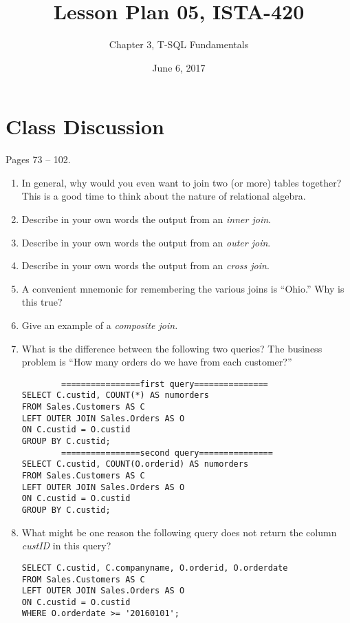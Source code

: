 \documentclass{article}
\title{Lesson Plan 05, ISTA-420}
\author{Chapter 3, T-SQL Fundamentals}
\date{June 6, 2017}
\begin{document}
    

    \maketitle{}

    \section{Class Discussion}

    Pages 73 -- 102.

    \begin{enumerate}
        \item In general, why would you even want to join two (or more) tables together? This is a good time to think about the nature of relational algebra.
        \item Describe in your own words the output from an \textit{inner join}.
        \item Describe in your own words the output from an \textit{outer join}.
        \item Describe in your own words the output from an \textit{cross join}.
        \item A convenient mnemonic for remembering the various joins is ``Ohio.'' Why is this true?
        \item Give an example of a \textit{composite join.}
        \item What is the difference between the following two queries? The business problem is ``How many orders do we have from each customer?''

        \begin{verbatim}
        ================first query===============
SELECT C.custid, COUNT(*) AS numorders
FROM Sales.Customers AS C
LEFT OUTER JOIN Sales.Orders AS O
ON C.custid = O.custid
GROUP BY C.custid;
        ================second query===============
SELECT C.custid, COUNT(O.orderid) AS numorders
FROM Sales.Customers AS C
LEFT OUTER JOIN Sales.Orders AS O
ON C.custid = O.custid
GROUP BY C.custid;
        \end{verbatim}
    \item What might be one reason the following query does not return the column \textit{custID} in this query?

        \begin{verbatim}
SELECT C.custid, C.companyname, O.orderid, O.orderdate
FROM Sales.Customers AS C
LEFT OUTER JOIN Sales.Orders AS O
ON C.custid = O.custid
WHERE O.orderdate >= '20160101';
        \end{verbatim}

    \end{enumerate}
\end{document}
